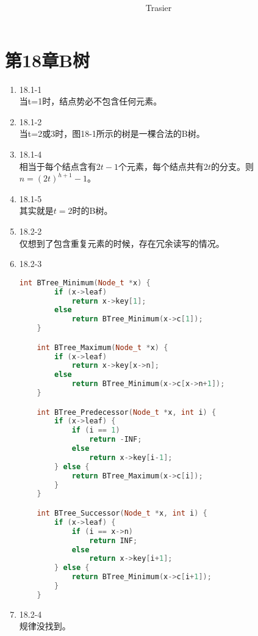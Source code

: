 \documentclass[UTF8]{ctexart}
\begin{document}
\title{\\}
\vspace{2cm}
\author{\Large Trasier}
\date{}
\maketitle

\section*{第18章\quad B树}
\begin{enumerate}
    \item 18.1-1 \\
	当t=1时，结点势必不包含任何元素。
	
	\item 18.1-2 \\
	当t=2或3时，图18-1所示的树是一棵合法的B树。
	
	\item 18.1-4 \\
	相当于每个结点含有$2t-1$个元素，每个结点共有$2t$的分支。则
	$n = (2t)^{h+1}-1$。
	
	\item 18.1-5 \\
	其实就是$t=2$时的B树。
	
	\item 18.2-2 \\
	仅想到了包含重复元素的时候，存在冗余读写的情况。
	
	\item 18.2-3 \\
	\begin{lstlisting}[language=c++]
	int BTree_Minimum(Node_t *x) {
		if (x->leaf)
			return x->key[1];
		else
			return BTree_Minimum(x->c[1]);
	}

	int BTree_Maximum(Node_t *x) {
		if (x->leaf)
			return x->key[x->n];
		else
			return BTree_Minimum(x->c[x->n+1]);
	}

	int BTree_Predecessor(Node_t *x, int i) {
		if (x->leaf) {
			if (i == 1)
				return -INF;
			else
				return x->key[i-1];
		} else {
			return BTree_Maximum(x->c[i]);
		}
	}

	int BTree_Successor(Node_t *x, int i) {
		if (x->leaf) {
			if (i == x->n)
				return INF;
			else
				return x->key[i+1];
		} else {
			return BTree_Minimum(x->c[i+1]);
		}
	}
	\end{lstlisting}
	
	\item 18.2-4 \\
	规律没找到。
	

\end{enumerate}
\end{document}
